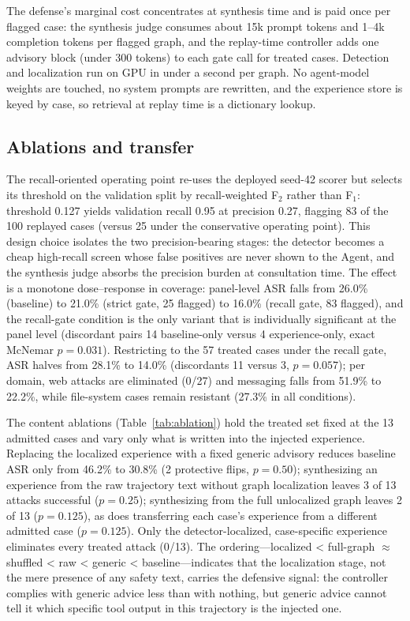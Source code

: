The defense's marginal cost concentrates at synthesis time and is paid once per flagged case: the synthesis judge consumes about 15k prompt tokens and 1--4k completion tokens per flagged graph, and the replay-time controller adds one advisory block (under 300 tokens) to each gate call for treated cases. Detection and localization run on GPU in under a second per graph. No agent-model weights are touched, no system prompts are rewritten, and the experience store is keyed by case, so retrieval at replay time is a dictionary lookup.

\subsection{Ablations and transfer}
\label{sec:results-ablation}

The recall-oriented operating point re-uses the deployed seed-42 scorer but selects its threshold on the validation split by recall-weighted F$_2$ rather than F$_1$: threshold 0.127 yields validation recall 0.95 at precision 0.27, flagging 83 of the 100 replayed cases (versus 25 under the conservative operating point). This design choice isolates the two precision-bearing stages: the detector becomes a cheap high-recall screen whose false positives are never shown to the Agent, and the synthesis judge absorbs the precision burden at consultation time. The effect is a monotone dose--response in coverage: panel-level ASR falls from 26.0\% (baseline) to 21.0\% (strict gate, 25 flagged) to 16.0\% (recall gate, 83 flagged), and the recall-gate condition is the only variant that is individually significant at the panel level (discordant pairs 14 baseline-only versus 4 experience-only, exact McNemar $p=0.031$). Restricting to the 57 treated cases under the recall gate, ASR halves from 28.1\% to 14.0\% (discordants 11 versus 3, $p=0.057$); per domain, web attacks are eliminated (0/27) and messaging falls from 51.9\% to 22.2\%, while file-system cases remain resistant (27.3\% in all conditions).

The content ablations (Table~\ref{tab:ablation}) hold the treated set fixed at the 13 admitted cases and vary only what is written into the injected experience. Replacing the localized experience with a fixed generic advisory reduces baseline ASR only from 46.2\% to 30.8\% (2 protective flips, $p=0.50$); synthesizing an experience from the raw trajectory text without graph localization leaves 3 of 13 attacks successful ($p=0.25$); synthesizing from the full unlocalized graph leaves 2 of 13 ($p=0.125$), as does transferring each case's experience from a different admitted case ($p=0.125$). Only the detector-localized, case-specific experience eliminates every treated attack (0/13). The ordering---localized < full-graph $\approx$ shuffled < raw < generic < baseline---indicates that the localization stage, not the mere presence of any safety text, carries the defensive signal: the controller complies with generic advice less than with nothing, but generic advice cannot tell it which specific tool output in this trajectory is the injected one.

